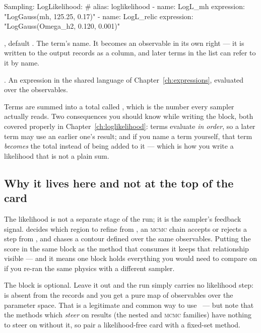\begin{yamlwin}
Sampling:
  LogLikelihood:                      # alias: loglikelihood
    - name: LogL_mh
      expression: "LogGauss(mh, 125.25, 0.17)"
    - name: LogL_relic
      expression: "LogGauss(Omega_h2, 0.120, 0.001)"
\end{yamlwin}

\begin{keylist}
  \item[name] \opt, default . The term's name. It becomes an observable in its
        own right --- it is written to the output records as a column, and later terms in
        the list can refer to it by name.
  \item[expression] \req. An expression in the shared language of
        Chapter~\ref{ch:expressions}, evaluated over the observables.
\end{keylist}

Terms are summed into a total called , which is the number every sampler
actually reads. Two consequences you should know while writing the block, both covered
properly in Chapter~\ref{ch:loglikelihood}: terms evaluate \emph{in order}, so a later
term may use an earlier one's result; and if you name a term  yourself, that
term \emph{becomes} the total instead of being added to it --- which is how you write a
likelihood that is not a plain sum.

\subsection*{Why it lives here and not at the top of the card}

The likelihood is not a separate stage of the run; it is the sampler's feedback signal.
 decides which region to refine from , an \textsc{mcmc} chain
accepts or rejects a step from , and  chases a
contour defined over the same observables. Putting the score in the same block as the
method that consumes it keeps that relationship visible --- and it means one block holds
everything you would need to compare on if you re-ran the same physics with a different
sampler.

\begin{jnote}
The block is optional. Leave it out and the run simply carries no likelihood step:
 is absent from the records and you get a pure map of observables over the
parameter space. That is a legitimate and common way to use \Jtwo\ --- but note that the
methods which \emph{steer} on results (the nested and \textsc{mcmc} families) have
nothing to steer on without it, so pair a likelihood-free card with a fixed-set method.
\end{jnote}

